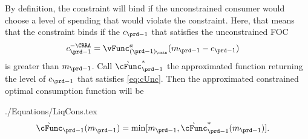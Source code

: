 \documentclass[\econtexRoot/SolvingMicroDSOPs]{subfiles}
\begin{document}
By definition, the constraint will bind if the unconstrained consumer
would choose a level of spending that would violate the constraint.
Here, that means that the constraint binds if the $c_{\prd-1}$
that satisfies the unconstrained FOC
\begin{equation}\begin{gathered}\begin{aligned}
      c_{\prd-1}^{-\CRRA}  & = \vFunc^{a}_{({\prd-1})_\cntn}(m_{\prd-1}-c_{\prd-1}) \label{eq:cUnc}
    \end{aligned}\end{gathered}\end{equation}
is greater than $m_{\prd-1}$.  Call $\grave{\cFunc}^{\ast}_{\prd-1}$ the approximated function
returning the level of $c_{\prd-1}$ that satisfies \eqref{eq:cUnc}.
Then the approximated constrained optimal consumption function will be
\begin{verbatimwrite}{./Equations/LiqCons.tex}
  \begin{equation}\begin{gathered}\begin{aligned}
        \grave{\cFunc}_{\prd-1}(m_{\prd-1})  & = \min[{m}_{\prd-1},\grave{\cFunc}^{\ast}_{\prd-1}(m_{\prd-1})] \label{eq:LiqCons}.
      \end{aligned}\end{gathered}\end{equation}
\end{verbatimwrite}
\unskip

\end{document}
